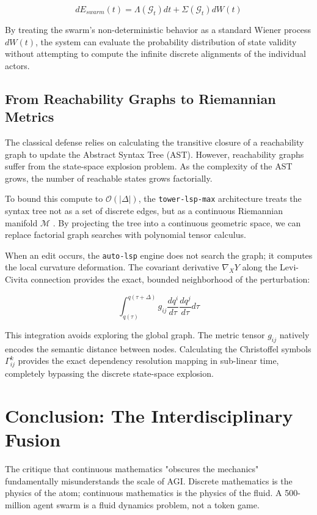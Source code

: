 \begin{equation}
dE_{swarm}(t) = \Lambda(\mathcal{G}_t) dt + \Sigma(\mathcal{G}_t) dW(t)
\end{equation}

By treating the swarm's non-deterministic behavior as a standard Wiener process $dW(t)$, the system can evaluate the probability distribution of state validity without attempting to compute the infinite discrete alignments of the individual actors.

\subsection{From Reachability Graphs to Riemannian Metrics}
The classical defense relies on calculating the transitive closure of a reachability graph to update the Abstract Syntax Tree (AST). However, reachability graphs suffer from the state-space explosion problem. As the complexity of the AST grows, the number of reachable states grows factorially.

To bound this compute to $\mathcal{O}(|\Delta|)$, the \texttt{tower-lsp-max} architecture treats the syntax tree not as a set of discrete edges, but as a continuous Riemannian manifold $\mathcal{M}$ \cite{back202520}. By projecting the tree into a continuous geometric space, we can replace factorial graph searches with polynomial tensor calculus. 

When an edit occurs, the \texttt{auto-lsp} engine does not search the graph; it computes the local curvature deformation. The covariant derivative $\nabla_X Y$ along the Levi-Civita connection provides the exact, bounded neighborhood of the perturbation:

\begin{equation}
\int_{q(\tau)}^{q(\tau+\Delta)} g_{ij} \frac{dq^i}{d\tau} \frac{dq^j}{d\tau} d\tau
\end{equation}

This integration avoids exploring the global graph. The metric tensor $g_{ij}$ natively encodes the semantic distance between nodes. Calculating the Christoffel symbols $\Gamma^k_{ij}$ provides the exact dependency resolution mapping in sub-linear time, completely bypassing the discrete state-space explosion.

\section{Conclusion: The Interdisciplinary Fusion}

The critique that continuous mathematics "obscures the mechanics" fundamentally misunderstands the scale of AGI. Discrete mathematics is the physics of the atom; continuous mathematics is the physics of the fluid. A 500-million agent swarm is a fluid dynamics problem, not a token game.

